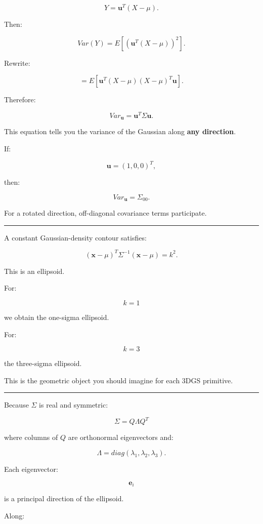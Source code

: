 \[
Y=
\mathbf u^T(X-\mu).
\]

Then:

\[
Var(Y)
=
E[
(\mathbf u^T(X-\mu))^2
].
\]

Rewrite:

\[
=
E[
\mathbf u^T
(X-\mu)(X-\mu)^T
\mathbf u
].
\]

Therefore:

\[
\boxed{
Var_{\mathbf u}
=
\mathbf u^T
\Sigma
\mathbf u.
}
\]

This equation tells you the variance of the Gaussian along \textbf{any direction}.

If:

\[
\mathbf u=
(1,0,0)^T,
\]

then:

\[
Var_{\mathbf u}
=
\Sigma_{00}.
\]

For a rotated direction, off-diagonal covariance terms participate.

\begin{center}\rule{0.5\linewidth}{0.5pt}\end{center}

A constant Gaussian-density contour satisfies:

\[
(\mathbf x-\mu)^T
\Sigma^{-1}
(\mathbf x-\mu)
=
k^2.
\]

This is an ellipsoid.

For:

\[
k=1
\]

we obtain the one-sigma ellipsoid.

For:

\[
k=3
\]

the three-sigma ellipsoid.

This is the geometric object you should imagine for each 3DGS primitive.

\begin{center}\rule{0.5\linewidth}{0.5pt}\end{center}

Because \(\Sigma\) is real and symmetric:

\[
\Sigma
=
Q\Lambda Q^T
\]

where columns of \(Q\) are orthonormal eigenvectors and:

\[
\Lambda=
diag(
\lambda_1,
\lambda_2,
\lambda_3
).
\]

Each eigenvector:

\[
\mathbf e_i
\]

is a principal direction of the ellipsoid.

Along:


